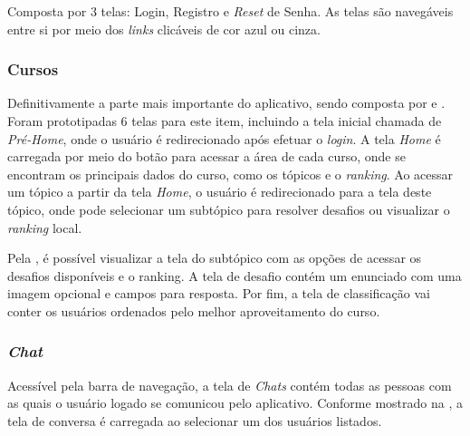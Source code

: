 Composta por 3 telas: Login, Registro e \textit{Reset} de Senha. As telas são navegáveis entre si por meio dos \textit{links} clicáveis de cor azul ou cinza.


\subsubsection{Cursos}

Definitivamente a parte mais importante do aplicativo, sendo composta por  e . Foram prototipadas 6 telas para este item, incluindo a tela inicial chamada de \textit{Pré-Home}, onde o usuário é redirecionado após efetuar o \textit{login}. A tela \textit{Home} é carregada por meio do botão para acessar a área de cada curso, onde se encontram os principais dados do curso, como os tópicos e o \textit{ranking}. Ao acessar um tópico a partir da tela \textit{Home}, o usuário é redirecionado para a tela deste tópico, onde pode selecionar um subtópico para resolver desafios ou visualizar o \textit{ranking} local.


Pela , é possível visualizar a tela do subtópico com as opções de acessar os desafios disponíveis e o ranking. A tela de desafio contém um enunciado com uma imagem opcional e campos para resposta. Por fim, a tela de classificação vai conter os usuários ordenados pelo melhor aproveitamento do curso.


\subsubsection{\textit{Chat}}

Acessível pela barra de navegação, a tela de \textit{Chats} contém todas as pessoas com as quais o usuário logado se comunicou pelo aplicativo. Conforme mostrado na , a tela de conversa é carregada ao selecionar um dos usuários listados.

